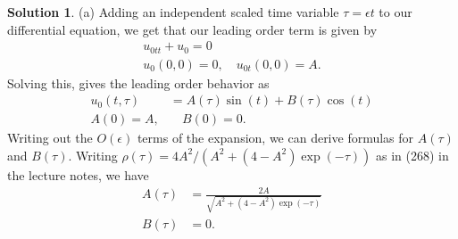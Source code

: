 \documentclass[12pt]{article}
\theoremstyle{definition}
\newtheorem{sol}{Solution}
\theoremstyle{remark}
\begin{document}
\begin{sol}
    (a) Adding an independent scaled time variable $\tau = \epsilon t$ to our differential equation, we get that our leading order term is given by
    \begin{align*}
        u_{0tt} + u_{0} = 0\\
        u_{0}(0,0) = 0, \quad u_{0t}(0,0) = A. 
    \end{align*}
    Solving this, gives the leading order behavior as 
    \begin{align*}
        u_{0}(t, \tau) &= A(\tau) \sin(t) + B(\tau) \cos(t)\\
        A(0) = A, & \quad B(0) = 0.
    \end{align*}
    Writing out the $O(\epsilon)$ terms of the expansion, we can derive formulas for $A(\tau)$ and  $B(\tau)$. Writing $\rho(\tau) = 4 A^{2} / ( A^{2} + (4 - A^{2}) \exp(- \tau) )$ as in (268) in the lecture notes, we have
    \begin{align*}
        A(\tau) &=\frac{2A}{\sqrt{A^{2} + (4 - A^{2}) \exp(- \tau) }}\\
        B(\tau) &= 0.
    \end{align*}


\end{sol}
\end{document}

